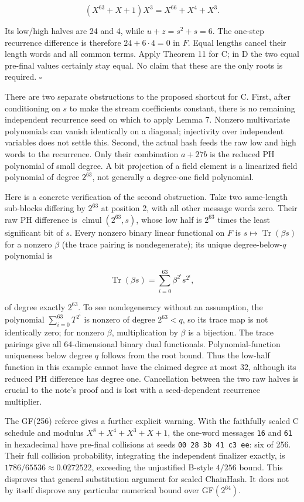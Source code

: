 \documentclass[
  11pt,
]{article}
\begin{document}
\[ (X^{63}+X+1)X^3=X^{66}+X^4+X^3. \]

Its low/high halves are 24 and 4, while \(u+z=s^2+s=6\). The one-step
recurrence difference is therefore \(24+6\cdot4=0\) in \(F\). Equal
lengths cancel their length words and all common terms. Apply Theorem 11
for C; in D the two equal pre-final values certainly stay equal. No
claim that these are the only roots is required. \(\square\)

There are two separate obstructions to the proposed shortcut for C.
First, after conditioning on \(s\) to make the stream coefficients
constant, there is no remaining independent recurrence seed on which to
apply Lemma 7. Nonzero multivariate polynomials can vanish identically
on a diagonal; injectivity over independent variables does not settle
this. Second, the actual hash feeds the raw low and high words to the
recurrence. Only their combination \(a+27b\) is the reduced PH
polynomial of small degree. A bit projection of a field element is a
linearized field polynomial of degree \(2^{63}\), not generally a
degree-one field polynomial.

Here is a concrete verification of the second obstruction. Take two
same-length sub-blocks differing by \(2^{63}\) at position 2, with all
other message words zero. Their raw PH difference is
\(\operatorname{clmul}(2^{63},s)\), whose low half is \(2^{63}\) times
the least significant bit of \(s\). Every nonzero binary linear
functional on \(F\) is \(s\mapsto\operatorname{Tr}(\beta s)\) for a
nonzero \(\beta\) (the trace pairing is nondegenerate); its unique
degree-below-\(q\) polynomial is

\[ \operatorname{Tr}(\beta s)=\sum_{i=0}^{63}\beta^{2^i}s^{2^i}, \]

of degree exactly \(2^{63}\). To see nondegeneracy without an
assumption, the polynomial \(\sum_{i=0}^{63}T^{2^i}\) is nonzero of
degree \(2^{63}<q\), so its trace map is not identically zero; for
nonzero \(\beta\), multiplication by \(\beta\) is a bijection. The trace
pairings give all 64-dimensional binary dual functionals.
Polynomial-function uniqueness below degree \(q\) follows from the root
bound. Thus the low-half function in this example cannot have the
claimed degree at most 32, although its reduced PH difference has degree
one. Cancellation between the two raw halves is crucial to the note's
proof and is lost with a seed-dependent recurrence multiplier.

The GF(256) referee gives a further explicit warning. With the
faithfully scaled C schedule and modulus \(X^8+X^4+X^3+X+1\), the
one-word messages \texttt{16} and \texttt{61} in hexadecimal have
pre-final collisions at seeds \texttt{00\ 28\ 3b\ 41\ c3\ ee}: six of
256. Their full collision probability, integrating the independent
finalizer exactly, is \(1786/65536\approx0.0272522\), exceeding the
unjustified B-style \(4/256\) bound. This disproves that general
substitution argument for scaled ChainHash. It does not by itself
disprove any particular numerical bound over GF\((2^{64})\).
\end{document}
